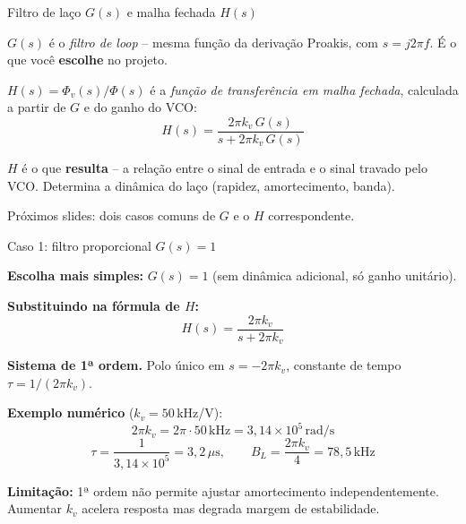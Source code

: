 
\begin{frame}{Filtro de laço $G(s)$ e malha fechada $H(s)$}

\textbf{$G(s)$} é o \emph{filtro de loop} -- mesma função da derivação Proakis, com $s = j2\pi f$. É o que você \textbf{escolhe} no projeto.

\pause
\vspace{0.3cm}
\textbf{$H(s) = \Phi_v(s)/\Phi(s)$} é a \emph{função de transferência em malha fechada}, calculada a partir de $G$ e do ganho do VCO:
\[
\boxed{\;H(s) = \frac{2\pi k_v\,G(s)}{s + 2\pi k_v\,G(s)}\;}
\]

\pause
\vspace{0.3cm}
$H$ é o que \textbf{resulta} -- a relação entre o sinal de entrada e o sinal travado pelo VCO. Determina a dinâmica do laço (rapidez, amortecimento, banda).

\vspace{0.3cm}
Próximos slides: dois casos comuns de $G$ e o $H$ correspondente.

\end{frame}


\begin{frame}{Caso 1: filtro proporcional $G(s) = 1$}

\textbf{Escolha mais simples:} $G(s) = 1$ (sem dinâmica adicional, só ganho unitário).

\pause
\textbf{Substituindo na fórmula de $H$:}
\[
H(s) = \frac{2\pi k_v}{s + 2\pi k_v}
\]

\textbf{Sistema de 1ª ordem.} Polo único em $s = -2\pi k_v$, constante de tempo $\tau = 1/(2\pi k_v)$.

\pause
\vspace{0.3cm}
\textbf{Exemplo numérico} ($k_v = 50$\,kHz/V):
\[
2\pi k_v = 2\pi\cdot 50\,\text{kHz} = 3{,}14\!\times\!10^5\,\text{rad/s}
\]
\[
\tau = \frac{1}{3{,}14\!\times\!10^5} = 3{,}2\,\mu\text{s}, \qquad B_L = \frac{2\pi k_v}{4} = 78{,}5\,\text{kHz}
\]

\pause
\textbf{Limitação:} 1ª ordem não permite ajustar amortecimento independentemente. Aumentar $k_v$ acelera resposta mas degrada margem de estabilidade.

\end{frame}


